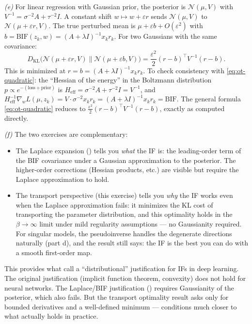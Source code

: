 \begin{solution}[ex:bif-ot]
\textit{(e)} For linear regression with Gaussian prior, the posterior is $\mathcal{N}(\mu,V)$ with $V^{-1} = \sigma^{-2}A + \tau^{-2}I$. A constant shift $w\mapsto w+\varepsilon r$ sends $\mathcal{N}(\mu,V)$ to $\mathcal{N}(\mu+\varepsilon r,V)$. The true perturbed mean is $\mu + \varepsilon b + O(\varepsilon^2)$ with $b = \mathrm{BIF}(z_k,w) = (A+\lambda I)^{-1}x_k r_k$. For two Gaussians with the same covariance:
\[
  D_{\mathrm{KL}}\bigl(\mathcal{N}(\mu+\varepsilon r,V)\|\mathcal{N}(\mu+\varepsilon b,V)\bigr) = \frac{\varepsilon^2}{2}(r-b)^\top V^{-1}(r-b).
\]
This is minimized at $r = b = (A+\lambda I)^{-1}x_k r_k$. To check consistency with \eqref{eq:ot-quadratic}: the ``Hessian of the energy'' in the Boltzmann distribution $p \propto e^{-(\text{loss}+\text{prior})}$ is $H_{\mathrm{eff}} = \sigma^{-2}A + \tau^{-2}I = V^{-1}$, and $H_{\mathrm{eff}}^{-1}\nabla_w L(\mu,z_k) = V\cdot\sigma^{-2}x_k r_k = (A+\lambda I)^{-1}x_k r_k = \mathrm{BIF}$. The general formula \eqref{eq:ot-quadratic} reduces to $\frac{\varepsilon^2}{2}(r-b)^\top V^{-1}(r-b)$, exactly as computed directly.

\textit{(f)} The two exercises are complementary:
\begin{itemize}
  \item The Laplace expansion () tells you \emph{what} the IF is: the leading-order term of the BIF covariance under a Gaussian approximation to the posterior. The higher-order corrections (Hessian products, etc.) are visible but require the Laplace approximation to hold.
  \item The transport perspective (this exercise) tells you \emph{why} the IF works even when the Laplace approximation fails: it minimizes the KL cost of transporting the parameter distribution, and this optimality holds in the $\beta\to\infty$ limit under mild regularity assumptions --- no Gaussianity required. For singular models, the pseudoinverse handles the degenerate directions naturally (part d), and the result still says: the IF is the best you can do with a smooth first-order map.
\end{itemize}
This provides what \citet{mlodozeniec2025distributional} call a ``distributional'' justification for IFs in deep learning. The original justification (implicit function theorem, convexity) does not hold for neural networks. The Laplace/BIF justification () requires Gaussianity of the posterior, which also fails. But the transport optimality result asks only for bounded derivatives and a well-defined minimum --- conditions much closer to what actually holds in practice.

\end{solution}

